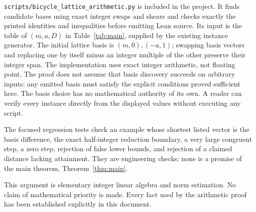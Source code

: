 \documentclass{article}
\begin{document}
\texttt{scripts/bicycle\_lattice\_arithmetic.py} is included in the project. It finds
candidate bases using exact integer swaps and shears and checks exactly the
printed identities and inequalities before emitting Lean source. Its input
is the table of \((m,a,D)\) in Table~\ref{tab:main}, supplied by the existing instance
generator. The initial lattice basis is \((m,0),(-a,1)\); swapping basis vectors and
replacing one by itself minus an integer multiple of the other preserve
their integer span. The implementation uses exact integer arithmetic,
not floating point. The proof does not assume that basis discovery succeeds
on arbitrary inputs: any emitted basis must satisfy the explicit conditions
proved sufficient here. The basis choice has no mathematical authority of
its own. A reader can verify every instance directly from the displayed
values without executing any script.

The focused regression tests check an example whose shortest listed vector
is the basis difference, the exact half-integer reduction boundary, a very
large congruent step, a zero step, rejection of false lower bounds, and
rejection of a claimed distance lacking attainment. They are engineering
checks; none is a premise of the main theorem, Theorem~\ref{thm:main}.

This argument is elementary integer linear algebra and norm estimation.
No claim of mathematical priority is made. Every fact used by the arithmetic
proof has been established explicitly in this document.
\end{document}
